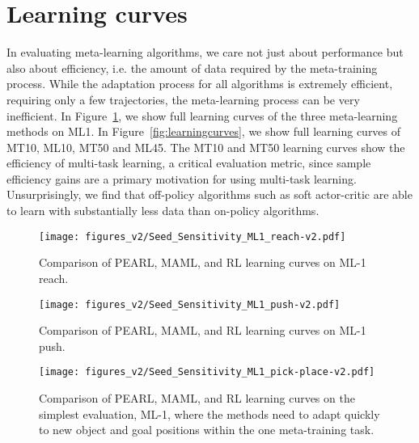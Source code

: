 \section{Learning curves}
\label{app:curves}

In evaluating meta-learning algorithms, we care not just about performance but also about efficiency, i.e. the amount of data required by the meta-training process. While the adaptation process for all algorithms is extremely efficient, requiring only a few trajectories, the meta-learning process can be very inefficient.
In Figure~\ref{fig:babyresults}, we show full learning curves of the three meta-learning methods on ML1. In Figure~\ref{fig:learningcurves}, we show full learning curves of MT10, ML10, MT50 and ML45.
The MT10 and MT50 learning curves show the efficiency of multi-task learning, a critical evaluation metric, since sample efficiency gains are a primary motivation for using multi-task learning. 
Unsurprisingly, we find that off-policy algorithms such as soft actor-critic are able to learn with substantially less data than on-policy algorithms.


\begin{figure}[H]
    \centering
\texttt{[image: figures\_v2/Seed\_Sensitivity\_ML1\_reach-v2.pdf]}
    \caption{Comparison of PEARL, MAML, and RL learning curves on ML-1 reach.}
    \label{fig:babyresults}
\end{figure}
\begin{figure}[H]
\centering
    \texttt{[image: figures\_v2/Seed\_Sensitivity\_ML1\_push-v2.pdf]}
    \caption{Comparison of PEARL, MAML, and RL learning curves on ML-1 push.}
    \label{fig:ml1-push}
\end{figure}
\clearpage
\begin{figure}[H]
    \centering
    \texttt{[image: figures\_v2/Seed\_Sensitivity\_ML1\_pick-place-v2.pdf]}
    \label{fig:ml1-pick-place}
    \caption{Comparison of PEARL, MAML, and RL learning curves on the simplest evaluation, ML-1, where the methods need to adapt quickly to new object and goal positions within the one meta-training task.}
\end{figure}


